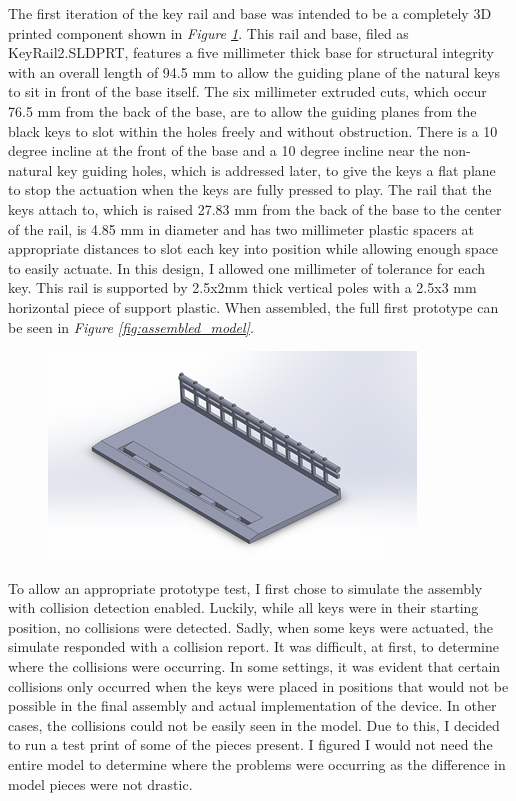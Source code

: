 The first iteration of the key rail and base was intended to be a completely 3D printed component shown in \textit{Figure \ref{fig:base_model1}}. This rail and base, filed as KeyRail2.SLDPRT, features a five millimeter thick base for structural integrity with an overall length of 94.5 mm to allow the guiding plane of the natural keys to sit in front of the base itself. The six millimeter extruded cuts, which occur 76.5 mm from the back of the base, are to allow the guiding planes from the black keys to slot within the holes freely and without obstruction. There is a 10 degree incline at the front of the base and a 10 degree incline near the non-natural key guiding holes, which is addressed later, to give the keys a flat plane to stop the actuation when the keys are fully pressed to play. The rail that the keys attach to, which is raised 27.83 mm from the back of the base to the center of the rail, is 4.85 mm in diameter and has two millimeter plastic spacers at appropriate distances to slot each key into position while allowing enough space to easily actuate. In this design, I allowed one millimeter of tolerance for each key. This rail is supported by 2.5x2mm thick vertical poles with a 2.5x3 mm horizontal piece of support plastic. When assembled, the full first prototype can be seen in \textit{Figure \ref{fig:assembled_model}}.

\begin{figure}[h!]
  \centering
  \includegraphics[width=0.8\linewidth]{image/BaseModel1.png}
  \caption{}
  \label{fig:base_model1}
\end{figure}

To allow an appropriate prototype test, I first chose to simulate the assembly with collision detection enabled. Luckily, while all keys were in their starting position, no collisions were detected. Sadly, when some keys were actuated, the simulate responded with a collision report. It was difficult, at first, to determine where the collisions were occurring. In some settings, it was evident that certain collisions only occurred when the keys were placed in positions that would not be possible in the final assembly and actual implementation of the device. In other cases, the collisions could not be easily seen in the model. Due to this, I decided to run a test print of some of the pieces present. I figured I would not need the entire model to determine where the problems were occurring as the difference in model pieces were not drastic.

